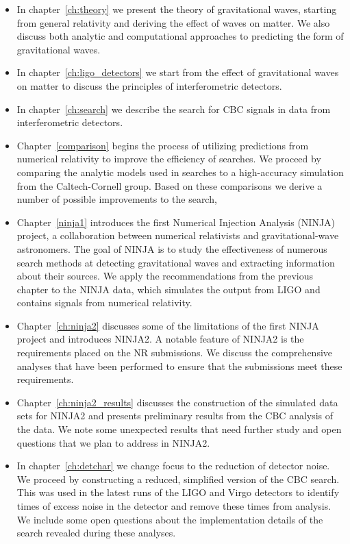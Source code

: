 \begin{itemize}

\item In chapter~\ref{ch:theory} we present the theory of
gravitational waves, starting from general relativity and deriving
the effect of waves on matter.  We also discuss both analytic and
computational approaches to predicting the form of gravitational
waves.

\item In chapter~\ref{ch:ligo_detectors} we start from the effect of
gravitational waves on matter to discuss the principles of
interferometric detectors. 

\item In chapter~\ref{ch:search} we describe the search for CBC
signals in data from interferometric detectors.

\item Chapter~\ref{comparison} begins the process of utilizing
predictions from numerical relativity to improve the efficiency of
searches.  We proceed by comparing the analytic models used in
searches to a high-accuracy simulation from the Caltech-Cornell group.
Based on these comparisons we derive a number of possible improvements
to the search,

\item Chapter~\ref{ninja1} introduces the first Numerical Injection
Analysis (NINJA) project, a collaboration between numerical
relativists and gravitational-wave astronomers.  The goal of NINJA is
to study the effectiveness of numerous search methods at detecting
gravitational waves and extracting information about their sources.
We apply the recommendations from the previous chapter to the NINJA
data, which simulates the output from LIGO and contains signals from
numerical relativity.

\item Chapter~\ref{ch:ninja2} discusses some of the limitations of the
first NINJA project and introduces NINJA2.  A notable feature of
NINJA2 is the requirements placed on the NR submissions.  We discuss 
the comprehensive analyses that have been performed to ensure that the
submissions meet these requirements.

\item Chapter~\ref{ch:ninja2_results} discusses the construction of the
simulated data sets for NINJA2 and presents preliminary results from
the CBC analysis of the data.  We note some unexpected results that
need further study and open questions that we plan to address in
NINJA2.

\item In chapter~\ref{ch:detchar} we change focus to the reduction of
detector noise.  We proceed by constructing a reduced, simplified
version of the CBC search.  This was used in the latest runs of the
LIGO and Virgo detectors to identify times of excess noise in the
detector and remove these times from analysis.  We include some open
questions about the implementation details of the search revealed
during these analyses.


\end{itemize}

